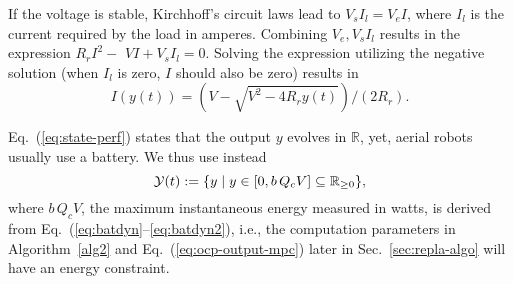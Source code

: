 \documentclass[letterpaper,10pt,conference,twoside]{IEEEtran}
\theoremstyle{definition}
\newtheorem{lem}[thm]{Lemma}
\newtheorem{defn}{Definition}[section]
\begin{document}
If the voltage %
is stable, Kirchhoff's circuit laws lead to $V_sI_l=V_eI$, where $I_l$ is the current required by the load %
in amperes. Combining $V_e,V_sI_l$ results in the %
expression $R_rI^2-$ $VI+V_sI_l=0$. Solving the expression utilizing the negative solution (when $I_l$ is zero, $I$ should also be zero) %
results in \vspace*{-1ex}
\begin{equation}\label{eq:batdyn2}
I(y(t))=(V-\sqrt{V^2-4R_ry(t)})/(2R_r).
\end{equation} 
%


Eq.~(\ref{eq:state-perf}) states that the output $y$ evolves in $\mathbb{R}$, %
yet, aerial robots usually use a battery.
We thus use instead
\begin{equation}\label{eq:output-const}
  {%
  \mathcal{Y}(t):=\{y\mid y\in[0,b\,Q_cV]\subseteq{\mathbb{R}_{\geq 0}}\},} 
\end{equation}
where $b\,Q_cV$, the maximum instantaneous energy %
measured in watts, is derived from Eq{\color{black}}.~(\ref{eq:batdyn}--\ref{eq:batdyn2}), i.e., the computation parameters in Algorithm~\ref{alg2} and Eq.~(\ref{eq:ocp-output-mpc}) later in Sec.~\ref{sec:repla-algo} will have an energy constraint.


\end{document}
